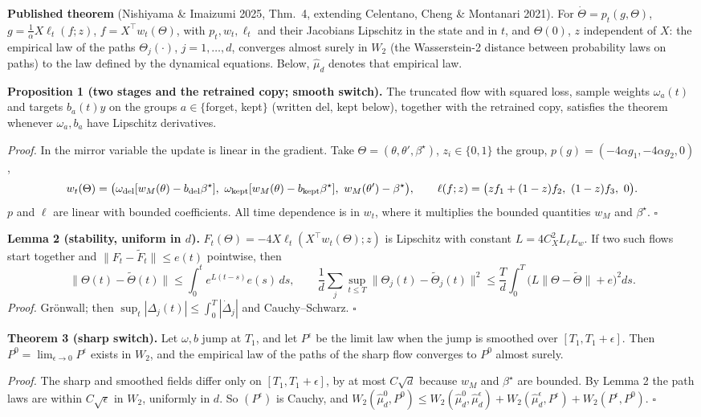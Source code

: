 \documentclass[10pt]{article}
\newcommand{\bs}{\beta^\star}\newcommand{\E}{\mathbb E}\newcommand{\asinh}{\operatorname{arcsinh}}\newcommand{\prox}{\operatorname{prox}}
\begin{document}
\textbf{Published theorem} (Nishiyama \& Imaizumi 2025, Thm.\ 4, extending Celentano, Cheng \& Montanari 2021). For $\dot\Theta=p_t(g,\Theta)$, $g=\frac1\alpha X\ell_t(f;z)$, $f=X^\top w_t(\Theta)$, with $p_t,w_t,\ell_t$ and their Jacobians Lipschitz in the state and in $t$, and $\Theta(0)$, $z$ independent of $X$: the empirical law of the paths $\Theta_j(\cdot)$, $j=1,\dots,d$, converges almost surely in $W_2$ (the Wasserstein-2 distance between probability laws on paths) to the law defined by the dynamical equations. Below, $\hat\mu_d$ denotes that empirical law.

\textbf{Proposition 1 (two stages and the retrained copy; smooth switch).} The truncated flow with squared loss, sample weights $\omega_a(t)$ and targets $b_a(t)y$ on the groups $a\in\{$forget, kept$\}$ (written del, kept below), together with the retrained copy, satisfies the theorem whenever $\omega_a,b_a$ have Lipschitz derivatives.

\emph{Proof.} In the mirror variable the update is linear in the gradient. Take $\Theta=(\theta,\theta',\bs)$, $z_i\in\{0,1\}$ the group, $p(g)=(-4\alpha g_1,-4\alpha g_2,0)$,
\[
w_t(\Theta)=\big(\omega_{\rm del}[w_M(\theta)-b_{\rm del}\bs],\ \omega_{\rm kept}[w_M(\theta)-b_{\rm kept}\bs],\ w_M(\theta')-\bs\big),\qquad
\ell(f;z)=\big(zf_1+(1-z)f_2,\ (1-z)f_3,\ 0\big).
\]
$p$ and $\ell$ are linear with bounded coefficients. All time dependence is in $w_t$, where it multiplies the bounded quantities $w_M$ and $\bs$. $\square$

\textbf{Lemma 2 (stability, uniform in $d$).} $F_t(\Theta)=-4X\ell_t(X^\top w_t(\Theta);z)$ is Lipschitz with constant $L=4C_X^2L_\ell L_w$. If two such flows start together and $\|F_t-\tilde F_t\|\le e(t)$ pointwise, then
\[
\|\Theta(t)-\tilde\Theta(t)\|\le\int_0^te^{L(t-s)}e(s)\,ds,\qquad
\frac1d\sum_j\sup_{t\le T}\|\Theta_j(t)-\tilde\Theta_j(t)\|^2\le\frac Td\int_0^T\big(L\|\Theta-\tilde\Theta\|+e\big)^2ds .
\]
\emph{Proof.} Gr\"onwall; then $\sup_t|\Delta_j(t)|\le\int_0^T|\dot\Delta_j|$ and Cauchy--Schwarz. $\square$

\textbf{Theorem 3 (sharp switch).} Let $\omega,b$ jump at $T_1$, and let $P^\epsilon$ be the limit law when the jump is smoothed over $[T_1,T_1+\epsilon]$. Then $P^0=\lim_{\epsilon\to0}P^\epsilon$ exists in $W_2$, and the empirical law of the paths of the sharp flow converges to $P^0$ almost surely.

\emph{Proof.} The sharp and smoothed fields differ only on $[T_1,T_1+\epsilon]$, by at most $C\sqrt d$ because $w_M$ and $\bs$ are bounded. By Lemma 2 the path laws are within $C\sqrt\epsilon$ in $W_2$, uniformly in $d$. So $(P^\epsilon)$ is Cauchy, and $W_2(\hat\mu_d^0,P^0)\le W_2(\hat\mu_d^0,\hat\mu_d^\epsilon)+W_2(\hat\mu_d^\epsilon,P^\epsilon)+W_2(P^\epsilon,P^0)$. $\square$
\end{document}
